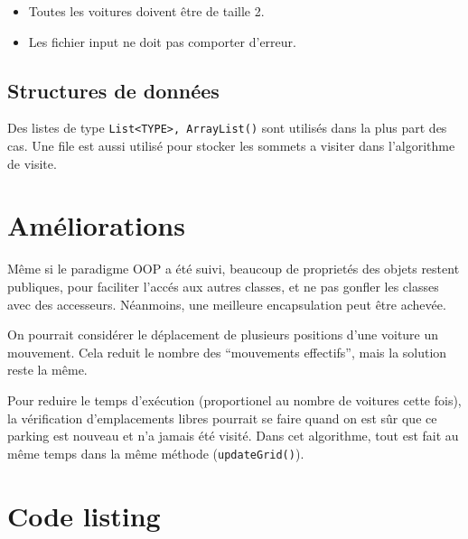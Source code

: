 \documentclass[11pt,a4paper]{article}
\begin{document}
\begin{itemize}
\item Toutes les voitures doivent être de taille 2.
\item Les fichier input ne doit pas comporter d'erreur.
\end{itemize}

\subsection{Structures de données}

Des listes de type \texttt{List<TYPE>, ArrayList()} sont utilisés dans
la plus part des cas. Une file est aussi utilisé pour stocker les
sommets a visiter dans l'algorithme de visite.

\section{Améliorations}

Même si le paradigme OOP a été suivi, beaucoup de proprietés des
objets restent publiques, pour faciliter l'accés aux autres classes,
et ne pas gonfler les classes avec des accesseurs. Néanmoins, une
meilleure encapsulation peut être achevée.

On pourrait considérer le déplacement de plusieurs positions d'une
voiture un mouvement. Cela reduit le nombre des ``mouvements effectifs'',
mais la solution reste la même.

Pour reduire le temps d'exécution (proportionel au nombre de voitures
cette fois), la vérification d'emplacements libres pourrait se faire
quand on est sûr que ce parking est nouveau et n'a jamais été
visité. Dans cet algorithme, tout est fait au même temps dans la même
méthode (\texttt{updateGrid()}).

\newpage

\section{Code listing}


\newpage

\newpage

\newpage

\newpage

\newpage

\end{document}
